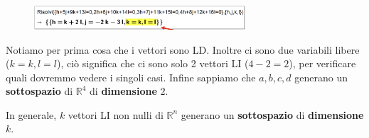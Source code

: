\documentclass[../main.tex]{subfiles}
\begin{document}
\begin{figure}[h]
    \centering
    \includegraphics[width=0.7\textwidth]{../images/casLD2.png}
\end{figure}
Notiamo per prima cosa che i vettori sono LD. Inoltre ci sono due variabili libere ($k=k, l=l$), ciò significa che ci sono solo
2 vettori LI ($4-2 = 2$), per verificare quali dovremmo vedere i singoli casi. Infine sappiamo che $a,b,c,d$ generano un \textbf{sottospazio}
di $\mathbb{R}^4$ di \textbf{dimensione} $2$.

In generale, $k$ vettori LI non nulli di $\mathbb{R}^n$ generano un \textbf{sottospazio} di \textbf{dimensione} $k$.
\end{document}
